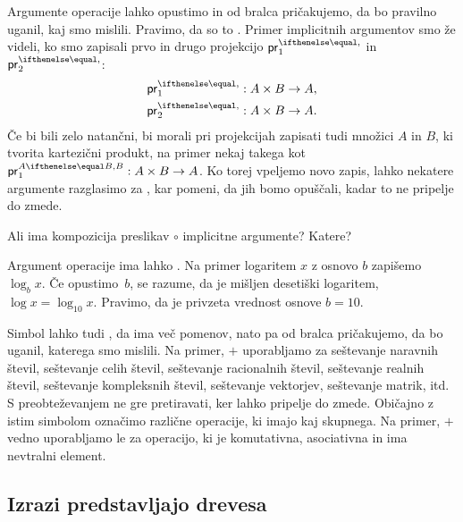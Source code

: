 Argumente operacije lahko opustimo in od bralca pričakujemo, da bo pravilno uganil, kaj smo mislili. Pravimo, da so to
. Primer implicitnih argumentov smo že videli, ko smo zapisali prvo in drugo projekcijo $\fst$ in
$\snd$:
\begin{align*}
  \fst &: A \times B \to A, \\
  \snd &: A \times B \to A.
\end{align*}
%
Če bi bili zelo natančni, bi morali pri projekcijah zapisati tudi množici $A$ in $B$, ki tvorita kartezični produkt, na
primer nekaj takega kot $\fst[A][B] : A \times B \to A$.
%
Ko torej vpeljemo novo zapis, lahko nekatere argumente razglasimo za , kar pomeni, da jih bomo opuščali,
kadar to ne pripelje do zmede.

\begin{vaja}
  Ali ima kompozicija preslikav $\circ$ implicitne argumente? Katere?
\end{vaja}

Argument operacije ima lahko . Na primer logaritem $x$ z osnovo $b$ zapišemo $\log_b x$. Če opustimo~$b$, se razume, da je mišljen desetiški logaritem, $\log x = \log_10 x$. Pravimo, da je privzeta vrednost osnove $b = 10$.

Simbol lahko tudi , da ima več pomenov, nato pa od bralca pričakujemo, da bo uganil, katerega smo
mislili. Na primer, $+$ uporabljamo za
%
seštevanje naravnih števil,
seštevanje celih števil,
seštevanje racionalnih števil,
seštevanje realnih števil,
seštevanje kompleksnih števil,
seštevanje vektorjev,
seštevanje matrik,
itd.
%
S preobteževanjem ne gre pretiravati, ker lahko pripelje do zmede. Običajno z istim simbolom označimo različne operacije, ki imajo kaj skupnega. Na primer, $+$ vedno uporabljamo le za operacijo, ki je komutativna, asociativna in ima nevtralni element.

\subsection{Izrazi predstavljajo drevesa}

